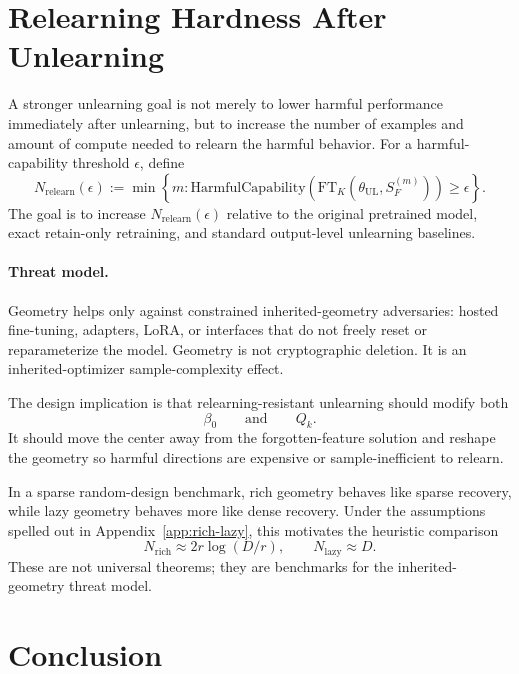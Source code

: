 \documentclass[11pt]{article}
\begin{document}
\section{Relearning Hardness After Unlearning}

A stronger unlearning goal is not merely to lower harmful performance immediately after unlearning, but to increase the number of examples and amount of compute needed to relearn the harmful behavior. For a harmful-capability threshold \(\epsilon\), define
\begin{equation}
    N_{\mathrm{relearn}}(\epsilon)
    :=
    \min
    \left\{
        m:
        \mathrm{HarmfulCapability}
        \left(
            \mathrm{FT}_K(\theta_{\mathrm{UL}},S_F^{(m)})
        \right)
        \geq \epsilon
    \right\}.
\end{equation}
The goal is to increase \(N_{\mathrm{relearn}}(\epsilon)\) relative to the original pretrained model, exact retain-only retraining, and standard output-level unlearning baselines.

\paragraph{Threat model.}
Geometry helps only against constrained inherited-geometry adversaries: hosted fine-tuning, adapters, LoRA, or interfaces that do not freely reset or reparameterize the model. Geometry is not cryptographic deletion. It is an inherited-optimizer sample-complexity effect.

The design implication is that relearning-resistant unlearning should modify both
\begin{equation}
    \beta_0
    \qquad\text{and}\qquad
    Q_k.
\end{equation}
It should move the center away from the forgotten-feature solution and reshape the geometry so harmful directions are expensive or sample-inefficient to relearn.

In a sparse random-design benchmark, rich geometry behaves like sparse recovery, while lazy geometry behaves more like dense recovery. Under the assumptions spelled out in Appendix~\ref{app:rich-lazy}, this motivates the heuristic comparison
\begin{equation}
    N_{\mathrm{rich}}\approx 2r\log(D/r),
    \qquad
    N_{\mathrm{lazy}}\approx D.
\end{equation}
These are not universal theorems; they are benchmarks for the inherited-geometry threat model.

\section{Conclusion}
\end{document}
